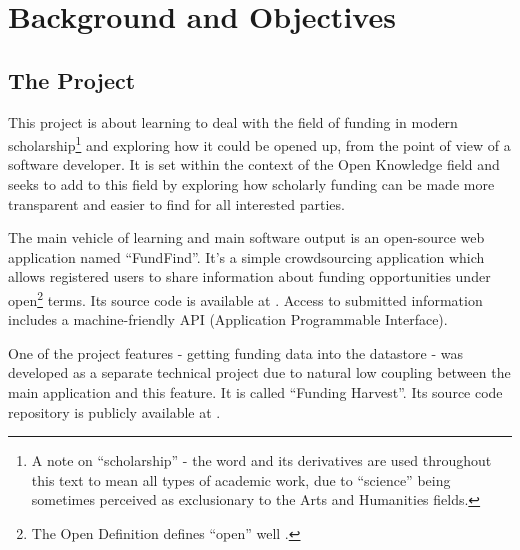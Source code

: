 \chapter{Background and Objectives}



\section{The Project}
\label{intro-project}
This project is about learning to deal with the field of funding in modern scholarship\footnote{A note on ``scholarship'' - the word and its derivatives are used throughout this text to mean all types of academic work, due to ``science'' being sometimes perceived as exclusionary to the Arts and Humanities fields.} and exploring how it could be opened up, from the point of view of a software developer. It is set within the context of the Open Knowledge field and seeks to add to this field by exploring how scholarly funding can be made more transparent and easier to find for all interested parties.

The main vehicle of learning and main software output is an open-source web application named ``FundFind''. It's a simple crowdsourcing application which allows registered users to share information about funding opportunities under open\footnote{The Open Definition defines ``open'' well \cite{od}.} terms. Its source code is available at \cite{fundfind-src}. Access to submitted information includes a machine-friendly API (Application Programmable Interface).

One of the project features - getting funding data into the datastore - was developed as a separate technical project due to natural low coupling between the main application and this feature. It is called ``Funding Harvest''. Its source code repository is publicly available at \cite{funding-harvest-src}.

